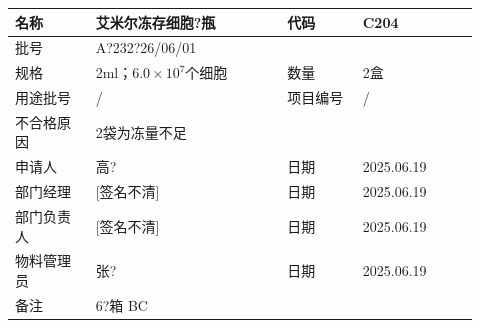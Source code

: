 \documentclass[UTF8,10pt,a4paper,fontset=fandol]{ctexart}
\newcommand{\fieldvalue}[1]{#1}
\newcommand{\handwritten}[1]{#1}
\begin{document}
\begin{tabular}{|p{0.16\linewidth}|p{0.38\linewidth}|p{0.15\linewidth}|p{0.23\linewidth}|}
\hline
名称 &
\fieldvalue{\handwritten{艾米尔冻存细胞?瓶}} &
代码 &
\fieldvalue{\handwritten{C204}} \\ \hline
批号 &
\fieldvalue{\handwritten{A?232?26/06/01}} &
\multicolumn{2}{l|}{} \\ \hline
规格 &
\fieldvalue{\handwritten{2ml；$6.0\times10^{7}$个细胞}} &
数量 &
\fieldvalue{\handwritten{2盒}} \\ \hline
用途批号 &
\fieldvalue{\handwritten{/}} &
项目编号 &
\fieldvalue{\handwritten{/}} \\ \hline
不合格原因 &
\multicolumn{3}{l|}{
\fieldvalue{\handwritten{2袋为冻量不足}}} \\ \hline
申请人 &
\fieldvalue{\handwritten{高?}} &
日期 &
\fieldvalue{\handwritten{2025.06.19}} \\ \hline
部门经理 &
\fieldvalue{\handwritten{[签名不清]}} &
日期 &
\fieldvalue{\handwritten{2025.06.19}} \\ \hline
部门负责人 &
\fieldvalue{\handwritten{[签名不清]}} &
日期 &
\fieldvalue{\handwritten{2025.06.19}} \\ \hline
物料管理员 &
\fieldvalue{\handwritten{张?}} &
日期 &
\fieldvalue{\handwritten{2025.06.19}} \\ \hline
备注 &
\multicolumn{3}{l|}{
\fieldvalue{\handwritten{6?箱 BC}}} \\ \hline
\end{tabular}
\end{document}
